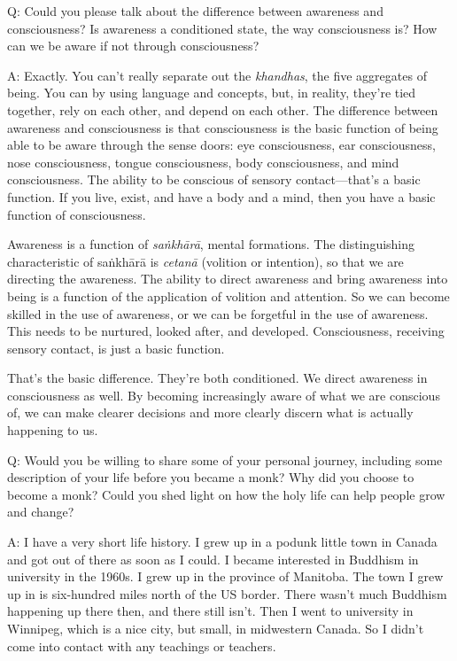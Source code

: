 \qaspace
Q: Could you please talk about the difference between awareness and
consciousness? Is awareness a conditioned state, the way consciousness
is? How can we be aware if not through consciousness?

\qaspace
A: Exactly. You can’t really separate out the \emph{khandhas}, the five
aggregates of being. You can by using language and concepts, but, in
reality, they’re tied together, rely on each other, and depend on each
other. The difference between awareness and consciousness is that
consciousness is the basic function of being able to be aware through
the sense doors: eye consciousness, ear consciousness, nose
consciousness, tongue consciousness, body consciousness, and mind
consciousness. The ability to be conscious of sensory contact—that’s a
basic function. If you live, exist, and have a body and a mind, then you
have a basic function of consciousness.

Awareness is a function of \emph{saṅkhārā}, mental formations. The
distinguishing characteristic of saṅkhārā is \emph{cetanā} (volition or
intention), so that we are directing the awareness. The ability to
direct awareness and bring awareness into being is a function of the
application of volition and attention. So we can become skilled in the
use of awareness, or we can be forgetful in the use of awareness. This
needs to be nurtured, looked after, and developed. Consciousness,
receiving sensory contact, is just a basic function.

That’s the basic difference. They’re both conditioned. We direct
awareness in consciousness as well. By becoming increasingly aware of
what we are conscious of, we can make clearer decisions and more clearly
discern what is actually happening to us.

\qaspace
Q: Would you be willing to share some of your personal journey,
including some description of your life before you became a monk? Why
did you choose to become a monk? Could you shed light on how the holy
life can help people grow and change?

\qaspace
A: I have a very short life history. I grew up in a podunk little town
in Canada and got out of there as soon as I could. I became interested
in Buddhism in university in the 1960s. I grew up in the province of
Manitoba. The town I grew up in is six-hundred miles north of the US
border. There wasn’t much Buddhism happening up there then, and there
still isn’t. Then I went to university in Winnipeg, which is a nice
city, but small, in midwestern Canada. So I didn’t come into contact
with any teachings or teachers.

